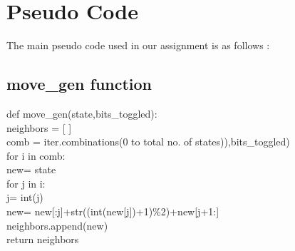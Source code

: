 \documentclass{article}
\begin{document}
\section{Pseudo Code}
The main pseudo code used in our assignment is as follows :
\subsection*{move\_gen function}
\vspace{5pt}
def move\_gen(state,bits\_toggled):
\vspace{5pt}
    \vspace{2pt}
    \\ \hspace*{20pt}neighbors = [ ]
    \vspace{2pt}
    \\ \hspace*{20pt}comb = iter.combinations(0 to total no. of states)),bits\_toggled)
    \vspace{2pt}
    \\ \hspace*{20pt}for i in comb:
    \vspace{2pt}
    \\ \hspace*{30pt}new= state
    \vspace{2pt}
    \\ \hspace*{30pt}for j in i:
    \vspace{2pt}
    \\ \hspace*{40pt}j= int(j)
    \vspace{2pt}
    \\ \hspace*{40pt}new= new[:j]+str((int(new[j])+1)\%2)+new[j+1:]
    \vspace{2pt}
    \\ \hspace*{70pt}neighbors.append(new)
    \vspace{2pt}
    \\ \hspace*{20pt}return neighbors
\end{document}
